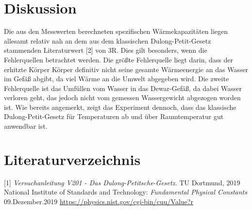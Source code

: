 \documentclass[titlepage = firstcover]{scrartcl}
\begin{document}
            \newpage
        
    \section{Diskussion}
        Die aus den Messwerten berechneten spezifischen Wärmekapazitäten liegen allesamt relativ nah an dem aus dem klassischen Dulong-Petit-Gesetz
        stammenden Literaturwert [2] von 3R. Dies gilt besonders, wenn die Fehlerquellen betrachtet werden. Die größte Fehlerquelle liegt darin, dass der 
        erhitzte Körper Körper definitiv nicht seine gesamte Wärmeenergie an das Wasser im Gefäß abgibt, da viel Wärme an die Umwelt abgegeben wird.
        Die zweite Fehlerquelle ist das Umfüllen vom Wasser in das Dewar-Gefäß, da dabei Wasser verloren geht, das jedoch nicht vom gemessen 
        Wassergewicht abgezogen worden ist. Wie bereits angemerkt, zeigt das Experiment dennoch, dass das klassische Dulong-Petit-Gesetz für 
        Temperaturen ab und über Raumtemperatur gut anwendbar ist.

    \newpage
    
    \section{Literaturverzeichnis}
        [1] \textit{Versuchanleitung V201 - Das Dulong-Petitsche-Gesetz.} TU Dortmund, 2019 \newline
        [2] National Institute of Standards and Technology: \textit{Fundamental Physical Constants} 09.Dezember.2019
            \url{https://physics.nist.gov/cgi-bin/cuu/Value?r}
        
\end{document}
